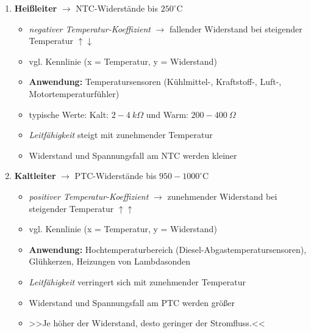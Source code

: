 \begin{enumerate}
\item
  \textbf{Heißleiter} $\to$ NTC-Widerstände bis $250^\circ\text{C}$

  \begin{itemize}
  \item
    \emph{negativer Temperatur-Koeffizient} $\to$ fallender Widerstand
    bei steigender Temperatur $\uparrow \downarrow$
  \item
    vgl. Kennlinie (x = Temperatur, y = Widerstand)
  \item
    \textbf{Anwendung:} Temperatursensoren (Kühlmittel-, Kraftstoff-,
    Luft-, Motortemperaturfühler)
  \item
    typische Werte: Kalt: $2 - 4~k\Omega$ und Warm:
    $200 - 400~\Omega$
  \item
    \emph{Leitfähigkeit} steigt mit zunehmender Temperatur
  \item
    Widerstand und Spannungsfall am NTC werden kleiner
  \end{itemize}
\item
  \textbf{Kaltleiter} $\to$ PTC-Widerstände bis
  $950 - 1000^\circ\text{C}$

  \begin{itemize}
  \item
    \emph{positiver Temperatur-Koeffizient} $\to$ zunehmender
    Widerstand bei steigender Temperatur $\uparrow \uparrow$
  \item
    vgl. Kennlinie (x = Temperatur, y = Widerstand)
  \item
    \textbf{Anwendung:} Hochtemperaturbereich
    (Diesel-Abgastemperatursensoren), Glühkerzen, Heizungen von
    Lambdasonden
  \item
    \emph{Leitfähigkeit} verringert sich mit zunehmender Temperatur
  \item
    Widerstand und Spannungsfall am PTC werden größer
  \item
    >>Je höher der Widerstand, desto geringer der Stromfluss.<<
  \end{itemize}
\end{enumerate}
